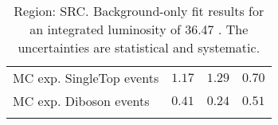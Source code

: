 \begin{table}
\begin{center}
{\begin{tabular*}{\textwidth}{@{\extracolsep{\fill}}lrrr}
        MC exp. SingleTop events         & $1.17$          & $1.29$          & $0.70$              \\
        MC exp. Diboson events         & $0.41$          & $0.24$          & $0.51$              \\
\noalign{\smallskip}\hline\noalign{\smallskip}
\end{tabular*}
}
\end{center}
\caption{Region: SRC. Background-only fit results for an integrated luminosity of 36.47 \ifb. The uncertainties are statistical and systematic.
}
\label{table.bkgonly.SRC1to3}
\end{table}
%
